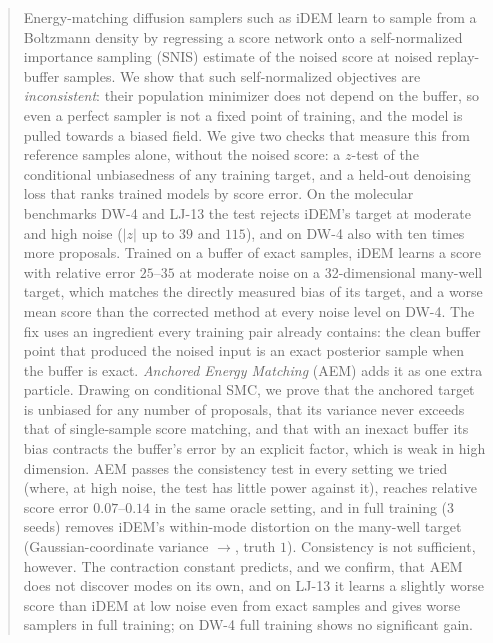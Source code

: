 \begin{abstract}
Energy-matching diffusion samplers such as iDEM learn to sample from a Boltzmann density by regressing a score network onto a self-normalized importance sampling (SNIS) estimate of the noised score at noised replay-buffer samples. We show that such self-normalized objectives are \emph{inconsistent}: their population minimizer does not depend on the buffer, so even a perfect sampler is not a fixed point of training, and the model is pulled towards a biased field. We give two checks that measure this from reference samples alone, without the noised score: a $z$-test of the conditional unbiasedness of any training target, and a held-out denoising loss that ranks trained models by score error. On the molecular benchmarks DW-4 and LJ-13 the test rejects iDEM's target at moderate and high noise ($|z|$ up to $39$ and $115$), and on DW-4 also with ten times more proposals. Trained on a buffer of exact samples, iDEM learns a score with relative error $25$--$35$ at moderate noise on a 32-dimensional many-well target, which matches the directly measured bias of its target, and a worse mean score than the corrected method at every noise level on DW-4. The fix uses an ingredient every training pair already contains: the clean buffer point that produced the noised input is an exact posterior sample when the buffer is exact. \emph{Anchored Energy Matching} (AEM) adds it as one extra particle. Drawing on conditional SMC, we prove that the anchored target is unbiased for any number of proposals, that its variance never exceeds that of single-sample score matching, and that with an inexact buffer its bias contracts the buffer's error by an explicit factor, which is weak in high dimension. AEM passes the consistency test in every setting we tried (where, at high noise, the test has little power against it), reaches relative score error $0.07$--$0.14$ in the same oracle setting, and in full training (3 seeds) removes iDEM's within-mode distortion on the many-well target (Gaussian-coordinate variance $\to$, truth $1$). Consistency is not sufficient, however. The contraction constant predicts, and we confirm, that AEM does not discover modes on its own, and on LJ-13 it learns a slightly worse score than iDEM at low noise even from exact samples and gives worse samplers in full training; on DW-4 full training shows no significant gain.
\end{abstract}
